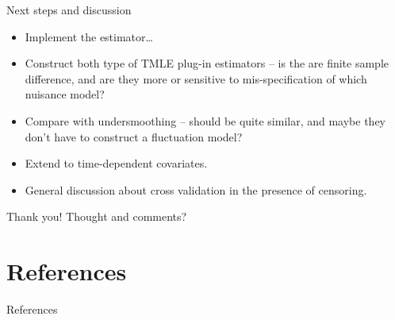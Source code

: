\documentclass[handout]{beamer}\usepackage{listings}
\begin{document}
\begin{frame}[label={sec:orgaf72e03}]{Next steps and discussion}
\begin{itemize}
\item Implement the estimator\ldots{}
\item Construct both type of TMLE plug-in estimators -- is the are finite sample difference, and are
they more or sensitive to mis-specification of which nuisance model?
\item Compare with undersmoothing -- should be quite similar, and maybe they don't have to construct a
fluctuation model?
\item Extend to time-dependent covariates.
\item General discussion about cross validation in the presence of censoring.
\end{itemize}
\end{frame}

\begin{frame}[label={sec:org996ba5a}]{Thank you!}
\centering Thought and comments?
\end{frame}

\section{References}
\label{sec:orgf372ba1}

\begin{frame}[label={sec:org94a8560}]{References}
\small 
\end{frame}
\end{document}
